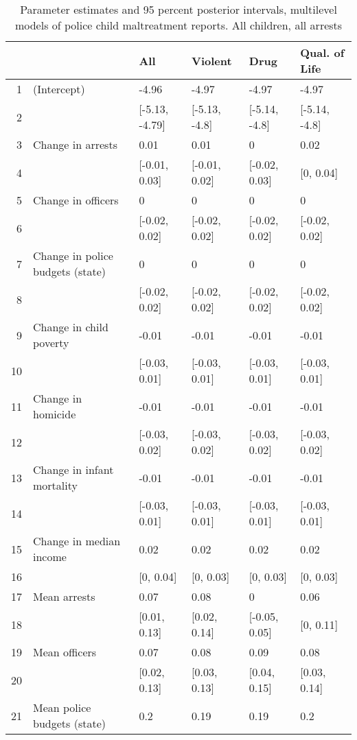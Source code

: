 \begin{table}[ht]
\centering
\caption{Parameter estimates and 95 percent posterior intervals, multilevel models of 
             police child maltreatment reports. All children, all arrests} 
\begin{tabular}{rlllll}
  \hline
 &   & All & Violent & Drug & Qual. of Life \\ 
  \hline
1 & (Intercept) & -4.96 & -4.97 & -4.97 & -4.97 \\ 
  2 &  & [-5.13, -4.79] & [-5.13, -4.8] & [-5.14, -4.8] & [-5.14, -4.8] \\ 
  3 & Change in arrests & 0.01 & 0.01 & 0 & 0.02 \\ 
  4 &  & [-0.01, 0.03] & [-0.01, 0.02] & [-0.02, 0.03] & [0, 0.04] \\ 
  5 & Change in officers & 0 & 0 & 0 & 0 \\ 
  6 &  & [-0.02, 0.02] & [-0.02, 0.02] & [-0.02, 0.02] & [-0.02, 0.02] \\ 
  7 & Change in police budgets (state) & 0 & 0 & 0 & 0 \\ 
  8 &  & [-0.02, 0.02] & [-0.02, 0.02] & [-0.02, 0.02] & [-0.02, 0.02] \\ 
  9 & Change in child poverty & -0.01 & -0.01 & -0.01 & -0.01 \\ 
  10 &  & [-0.03, 0.01] & [-0.03, 0.01] & [-0.03, 0.01] & [-0.03, 0.01] \\ 
  11 & Change in homicide & -0.01 & -0.01 & -0.01 & -0.01 \\ 
  12 &  & [-0.03, 0.02] & [-0.03, 0.02] & [-0.03, 0.02] & [-0.03, 0.02] \\ 
  13 & Change in infant mortality & -0.01 & -0.01 & -0.01 & -0.01 \\ 
  14 &  & [-0.03, 0.01] & [-0.03, 0.01] & [-0.03, 0.01] & [-0.03, 0.01] \\ 
  15 & Change in median income & 0.02 & 0.02 & 0.02 & 0.02 \\ 
  16 &  & [0, 0.04] & [0, 0.03] & [0, 0.03] & [0, 0.03] \\ 
  17 & Mean arrests & 0.07 & 0.08 & 0 & 0.06 \\ 
  18 &  & [0.01, 0.13] & [0.02, 0.14] & [-0.05, 0.05] & [0, 0.11] \\ 
  19 & Mean officers & 0.07 & 0.08 & 0.09 & 0.08 \\ 
  20 &  & [0.02, 0.13] & [0.03, 0.13] & [0.04, 0.15] & [0.03, 0.14] \\ 
  21 & Mean police budgets (state) & 0.2 & 0.19 & 0.19 & 0.2 \\ 

\end{tabular}
\end{table}
